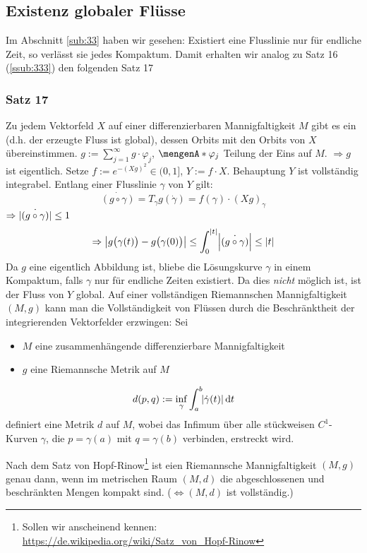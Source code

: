 \subsection{Existenz globaler Flüsse} %
\label{sub:34}
Im Abschnitt \ref{sub:33} haben wir gesehen: Existiert eine Flusslinie nur für endliche Zeit, so verlässt sie jedes Kompaktum. Damit erhalten wir analog zu Satz 16 (\ref{ssub:333}) den folgenden Satz 17

\subsubsection{Satz 17} %
\label{ssub:341}
Zu jedem Vektorfeld $X$ auf einer differenzierbaren Mannigfaltigkeit $M$ gibt es ein  (d.h. der erzeugte Fluss ist global), dessen
Orbits mit den Orbits von $X$ übereinstimmen.
$g := \sum_{j=1}^{\infty} g \cdot \varphi_j$, $\set{\varphi_j}$ Teilung der Eins auf $M$. $\Rightarrow g$ ist eigentlich. Setze $f := e^{- (X g)^2} \in (0,1]$, 
$Y := f \cdot X$. Behauptung $Y$ ist vollständig integrabel. Entlang einer Flusslinie $\gamma$ von $Y$ gilt: 
\[
	\dot{(g \circ \gamma)} = T_{\gamma} g (\dot{\gamma}) = f(\gamma) \cdot (X g)_\gamma
\]
$\Rightarrow \dot{\abs*{(g \circ \gamma)} } \le 1$ 
\[
	\Rightarrow \abs*{ g \enbrace[\big]{\gamma(t)} - g \enbrace[\big]{\gamma(0)}  } \le \int_{0} ^{\abs*{t} } \abs*{\dot{(g \circ \gamma)}} \le \abs*{t}    
\]
Da $g$ eine eigentlich Abbildung ist, bliebe die Lösungskurve $\gamma$ in einem Kompaktum, falls $\gamma$ nur für endliche Zeiten existiert. Da dies \emph{nicht} möglich 
ist, ist der Fluss von $Y$ global. \bewende 
Auf einer vollständigen Riemannschen Mannigfaltigkeit $(M,g)$ kann man die Vollständigkeit von Flüssen durch die Beschränktheit der integrierenden Vektorfelder erzwingen:
Sei
\begin{itemize}
	\item $M$ eine zusammenhängende differenzierbare Mannigfaltigkeit
	\item $g$ eine Riemannsche Metrik auf $M$
\end{itemize}
\[
	d(p,q) := \inf_{\gamma} \int_{a} ^{b} \! \abs*{\dot{\gamma}(t)}  \, \mathrm{d}t 
\]
definiert eine Metrik $d$ auf $M$, wobei das Infimum über alle stückweisen $C^1$-Kurven $\gamma$, die $p=\gamma(a)$ mit $q = \gamma(b)$ verbinden, erstreckt wird.

Nach dem Satz von Hopf-Rinow\footnote{Sollen wir anscheinend kennen: \url{https://de.wikipedia.org/wiki/Satz_von_Hopf-Rinow}} ist eien Riemannsche Mannigfaltigkeit $(M,g)$
 genau dann, wenn im metrischen Raum $(M,d)$ die abgeschlossenen und beschränkten Mengen kompakt sind. ($\Leftrightarrow (M,d)$ ist vollständig.)

